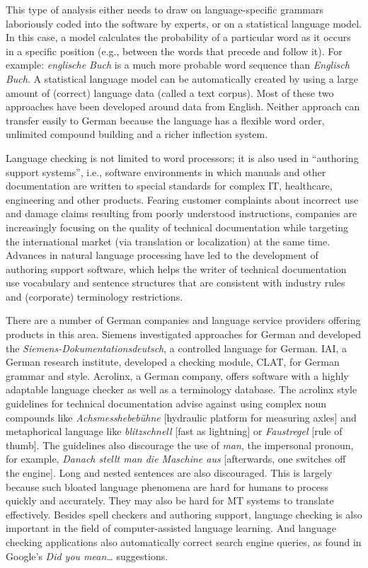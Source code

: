 \documentclass[]{../../metanetpaper}
\begin{document}
\begin{Parallel}[c]{80mm}{80mm}
{    This type of analysis either needs to draw on language-specific grammars laboriously coded into the software by experts, or on a statistical language model. In this case, a model calculates the probability of a particular word as it occurs in a specific position (e.g., between the words that precede and follow it). For example: \textit{englische Buch} is a much more probable word sequence than \textit{Englisch Buch}. A statistical language model can be automatically created by using a large amount of (correct) language data (called a text corpus). Most of these two approaches have been developed around data from English. Neither approach can transfer easily to German because the language has a flexible word order, unlimited compound building and a richer inflection system. 

    Language checking is not limited to word processors; it is also used in “authoring support systems”, i.e., software environments in which manuals and other documentation are written to special standards for complex IT, healthcare, engineering and other products. Fearing customer complaints about incorrect use and damage claims resulting from poorly understood instructions, companies are increasingly focusing on the quality of technical documentation while targeting the international market (via translation or localization) at the same time. Advances in natural language processing have led to the development of authoring support software, which helps the writer of technical documentation use vocabulary and sentence structures that are consistent with industry rules and (corporate) terminology restrictions.

    There are a number of German companies and language service providers offering products in this area. Siemens investigated approaches for German and developed the \textit{Siemens-Dokumentationsdeutsch}, a controlled language for German. IAI, a German research institute, developed a checking module, CLAT, for German grammar and style. Acrolinx, a German company, offers software with a highly adaptable language checker as well as a terminology database. The acrolinx style guidelines for technical documentation advise against using complex noun compounds like \textit{Achsmesshebebühne} {[}hydraulic platform for measuring axles{]} and metaphorical language like \textit{blitzschnell} {[}fast as lightning{]} or \textit{Faustregel} {[}rule of thumb{]}. The guidelines also discourage the use of \textit{man}, the impersonal pronoun, for example, \textit{Danach stellt man die Maschine aus} {[}afterwards, one switches off the engine{]}. Long and nested sentences are also discouraged. This is largely because such bloated language phenomena are hard for humans to process quickly and accurately. They may also be hard for MT systems to translate effectively.
Besides spell checkers and authoring support, language checking is also important in the field of computer-assisted language learning. And language checking applications also automatically correct search engine queries, as found in Google's \textit{Did you mean…} suggestions.
  }
  \ParallelPar


\end{Parallel}
\end{document}
